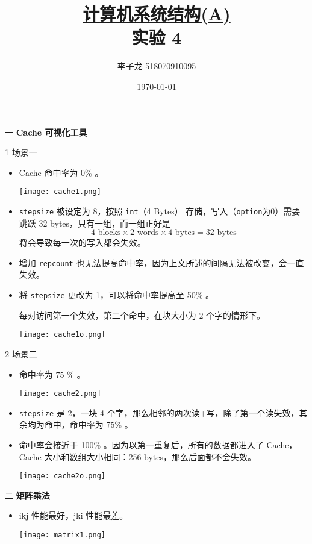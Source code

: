\documentclass[12pt,a4paper]{article}
\newenvironment{problems}{\begin{list}{}{\renewcommand{\makelabel}[1]{\textbf{##1}.\hfil}}}{\end{list}}
\newenvironment{steps}{\begin{list}{}{\renewcommand{\makelabel}[1]{(##1)\hfil}}}{\end{list}}
\begin{document}
\title{\normalsize \underline{计算机系统结构(A)}\\\LARGE 实验 4}
\author{李子龙 518070910095}
\date{\today}
\maketitle

\begin{problems}
    \item[一] \textbf{Cache 可视化工具}
    
    \begin{steps}
        \item[1] 场景一
        
        \begin{itemize}
            \item Cache 命中率为 0\% 。
            
            \texttt{[image: cache1.png]}
            \item \verb"stepsize" 被设定为 8，按照 \verb"int"（4 Bytes） 存储，写入（\verb"option"为0）需要跳跃 32 bytes，只有一组，而一组正好是
            \begin{equation*}
                4\text{ blocks}\times 2\text{ words}\times 4\text{ bytes} = 32 \text{ bytes}
            \end{equation*}
            将会导致每一次的写入都会失效。
            \item 增加 \verb"repcount" 也无法提高命中率，因为上文所述的间隔无法被改变，会一直失效。
            \item 将 \verb"stepsize" 更改为 1，可以将命中率提高至 50\% 。
            
            每对访问第一个失效，第二个命中，在块大小为 2 个字的情形下。

            \texttt{[image: cache1o.png]}
        \end{itemize}

        \item[2] 场景二
        \begin{itemize}
            \item 命中率为 75 \% 。
            
            \texttt{[image: cache2.png]}
            \item \verb"stepsize" 是 2，一块 4 个字，那么相邻的两次读+写，除了第一个读失效，其余均为命中，命中率为 75\% 。
            \item 命中率会接近于 100\% 。因为以第一重复后，所有的数据都进入了 Cache，Cache 大小和数组大小相同：256 bytes，那么后面都不会失效。
            
            \texttt{[image: cache2o.png]}
        \end{itemize}
    \end{steps}
    
    \item[二] \textbf{矩阵乘法}
    \begin{itemize}
        \item ikj 性能最好，jki 性能最差。
        
        \texttt{[image: matrix1.png]}
    \end{itemize}
\end{problems}
\end{document}
